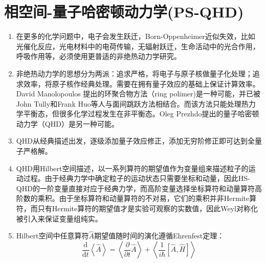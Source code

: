 \documentclass[12pt,a4paper,openany,twoside]{book}
\numberwithin{equation}{section}
\newcommand{\mean}[1]{\left\langle #1 \right\rangle}
\newcommand{\ud}{\mathrm{d}}
\begin{document}
    \chapter{相空间-量子哈密顿动力学(PS-QHD)}
      \begin{enumerate}
        \item 在更多的化学问题中，电子会发生跃迁，Born-Oppenheimer近似失效，比如光催化反应，光电材料中的电荷传输，无辐射跃迁，生命活动中的光合作用，呼吸作用等，必须使用更普适的非绝热动力学研究。

        \item 非绝热动力学的思想分为两派：追求严格，将电子与原子核做量子化处理；追求效率，将原子核作经典处理。需要在拥有量子效应的基础上保证计算效率。David Manolopoulos 提出的环聚合物方法（ring polimer)是一种可能，并已被John Tully和Frank Huo等人与面间跳跃方法相结合。而该方法只能处理热力学平衡态，但很多化学过程发生在非平衡态。Oleg Prezhdo提出的量子哈密顿动力学（QHD）是另一种可能。

        \item QHD从经典描述出发，逐级添加量子效应修正，添加无穷阶修正即可达到全量子严格解。

        \item QHD用Hilbert空间描述，以一系列算符的期望值作为变量组来描述粒子的运动过程。由于经典力学中确定粒子的运动状态只需要坐标和动量，因此HS-QHD的一阶变量直接对应于经典力学，而高阶变量选择坐标算符和动量算符高阶数的乘积。由于坐标算符和动量算符的不对易，它们的乘积并非Hermite算符，而只有Hermite算符的期望值才是实验可观察的实数值，因此Weyl对称化被引入来保证变量组纯实。

        \item Hilbert空间中任意算符$\hat{A}$期望值随时间的演化遵循Ehrenfest定理：
          \begin{equation}
            \frac{\ud}{\ud t}\mean{\hat{A}}=\mean{\frac{\partial}{\partial t} \hat{A}}+\mean{\frac{1}{i\hbar}\left[\hat{A},\hat{H}\right]}
          \end{equation}


\end{enumerate}
\end{document}
